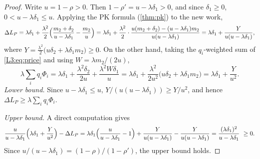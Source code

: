 \begin{proof}
Write $u=1-\rho>0$. Then $1-\rho'=u-\lambda\delta_1>0$, and since $\delta_1\ge0$,
$0<u-\lambda\delta_1\le u$. Applying the PK formula (\cref{thm:pk}) to the new work,
\[
  \Delta L_P=\lambda\delta_1+\frac{\lambda^2}{2}\Bigl(\frac{m_2+\delta_2}{u-\lambda\delta_1}-\frac{m_2}{u}\Bigr)
  =\lambda\delta_1+\frac{\lambda^2}{2}\cdot\frac{u(m_2+\delta_2)-(u-\lambda\delta_1)m_2}{u(u-\lambda\delta_1)}
  =\lambda\delta_1+\frac{Y}{u(u-\lambda\delta_1)},
\]
where $Y=\frac{\lambda^2}{2}\bigl(u\delta_2+\lambda\delta_1m_2\bigr)\ge0$. On the other hand,
taking the $q_i$-weighted sum of \cref{L3:eq:price} and using $W=\lambda m_2/(2u)$,
\[
  \lambda\sum_iq_i\Phi_i=\lambda\delta_1+\frac{\lambda^2\delta_2}{2u}+\frac{\lambda^2W\delta_1}{u}
  =\lambda\delta_1+\frac{\lambda^2}{2u^2}\bigl(u\delta_2+\lambda\delta_1m_2\bigr)
  =\lambda\delta_1+\frac{Y}{u^2}.
\]
\emph{Lower bound.} Since $u-\lambda\delta_1\le u$, $Y/(u(u-\lambda\delta_1))\ge Y/u^2$, and
hence $\Delta L_P\ge\lambda\sum_iq_i\Phi_i$.

\emph{Upper bound.} A direct computation gives
\[
  \frac{u}{u-\lambda\delta_1}\Bigl(\lambda\delta_1+\frac{Y}{u^2}\Bigr)-\Delta L_P
  =\lambda\delta_1\Bigl(\frac{u}{u-\lambda\delta_1}-1\Bigr)+\frac{Y}{u(u-\lambda\delta_1)}-\frac{Y}{u(u-\lambda\delta_1)}
  =\frac{(\lambda\delta_1)^2}{u-\lambda\delta_1}\ \ge0 .
\]
Since $u/(u-\lambda\delta_1)=(1-\rho)/(1-\rho')$, the upper bound holds.
\end{proof}

